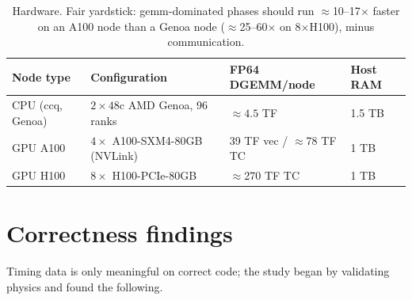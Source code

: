 \documentclass[11pt]{article}
\begin{document}
\begin{table}[H]\small\centering
\begin{tabular}{@{}llll@{}}
\toprule
Node type & Configuration & FP64 DGEMM/node & Host RAM \\
\midrule
CPU (ccq, Genoa) & $2\times 48$c AMD Genoa, 96 ranks & $\approx 4.5$ TF & 1.5 TB \\
GPU A100 & $4\times$ A100-SXM4-80GB (NVLink) & 39 TF vec / $\approx$78 TF TC & 1 TB \\
GPU H100 & $8\times$ H100-PCIe-80GB & $\approx$270 TF TC & 1 TB \\
\bottomrule
\end{tabular}
\caption{Hardware. Fair yardstick: gemm-dominated phases should run $\approx$10--17$\times$
faster on an A100 node than a Genoa node ($\approx$25--60$\times$ on 8$\times$H100), minus communication.}
\end{table}

\section{Correctness findings}
Timing data is only meaningful on correct code; the study began by validating physics
and found the following.
\end{document}
